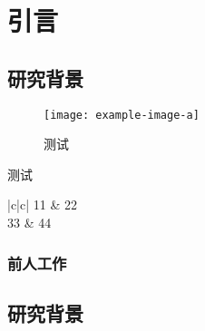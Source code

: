 \chapter{引言}

\section{研究背景}
\begin{figure}[tbh]
  \centering
  \texttt{[image: example-image-a]}
  \caption{测试}
\end{figure}
\begin{table}[tbh]
  \caption{测试}
  \centering
  \begin{tblr}{|c|c|}
    11 & 22 \\
    33 & 44 
  \end{tblr}
\end{table}
\subsection{前人工作}

\section{研究背景}
